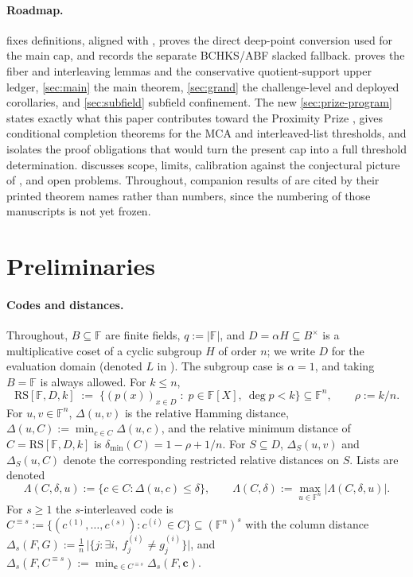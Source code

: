 \documentclass[11pt]{article}
\theoremstyle{definition}
\theoremstyle{remark}
\newcommand{\F}{\mathbb{F}}
\newcommand{\B}{B}
\newcommand{\RS}{\mathrm{RS}}
\newcommand{\dmin}{\delta_{\min}}
\newcommand{\dist}{\Delta}
\newcommand{\distS}{\Delta_S}
\newcommand{\Lst}{\Lambda}
\begin{document}
\paragraph{Roadmap.}  fixes definitions, aligned with \cite[Defs.~4.1, 4.3]{ABF26}, proves the direct deep-point conversion used for the main cap, and records the separate BCHKS/ABF slacked fallback.  proves the fiber and interleaving lemmas and the conservative quotient-support upper ledger, \cref{sec:main} the main theorem, \cref{sec:grand} the challenge-level and deployed corollaries, and \cref{sec:subfield} subfield confinement. The new \cref{sec:prize-program} states exactly what this paper contributes toward the Proximity Prize \cite{ProximityPrize}, gives conditional completion theorems for the MCA and interleaved-list thresholds, and isolates the proof obligations that would turn the present cap into a full threshold determination.  discusses scope, limits, calibration against the conjectural picture of \cite{Cho26b}, and open problems. Throughout, companion results of \cite{Cho26a,Cho26b} are cited by their printed theorem names rather than numbers, since the numbering of those manuscripts is not yet frozen.

\section{Preliminaries}\label{sec:prelim}

\paragraph{Codes and distances.} Throughout, $\B\subseteq\F$ are finite fields, $q:=|\F|$, and $D=\alpha H\subseteq\B^\times$ is a multiplicative coset of a cyclic subgroup $H$ of order $n$; we write $D$ for the evaluation domain (denoted $L$ in \cite{ABF26}). The subgroup case is $\alpha=1$, and taking $\B=\F$ is always allowed. For $k\le n$,
\[
\RS[\F,D,k]\;:=\;\bigl\{(p(x))_{x\in D}\;:\;p\in\F[X],\ \deg p<k\bigr\}\subseteq\F^n,
\qquad \rho:=k/n .
\]
For $u,v\in\F^n$, $\dist(u,v)$ is the relative Hamming distance, $\dist(u,C):=\min_{c\in C}\dist(u,c)$, and the relative minimum distance of $C=\RS[\F,D,k]$ is $\dmin(C)=1-\rho+1/n$. For $S\subseteq D$, $\distS(u,v)$ and $\distS(u,C)$ denote the corresponding restricted relative distances on $S$. Lists are denoted
\[
\Lst(C,\delta,u):=\{c\in C:\dist(u,c)\le\delta\},\qquad \Lst(C,\delta):=\max_{u\in\F^n}|\Lst(C,\delta,u)| .
\]
For $s\ge1$ the $s$-interleaved code is $C^{\equiv s}:=\{(c^{(1)},\dots,c^{(s)}):c^{(i)}\in C\}\subseteq(\F^n)^s$ with the column distance $\dist_s(F,G):=\frac1n\,\bigl|\{j:\exists i,\ f^{(i)}_j\ne g^{(i)}_j\}\bigr|$, and $\dist_s(F,C^{\equiv s}):=\min_{\mathbf c\in C^{\equiv s}}\dist_s(F,\mathbf c)$.
\end{document}
